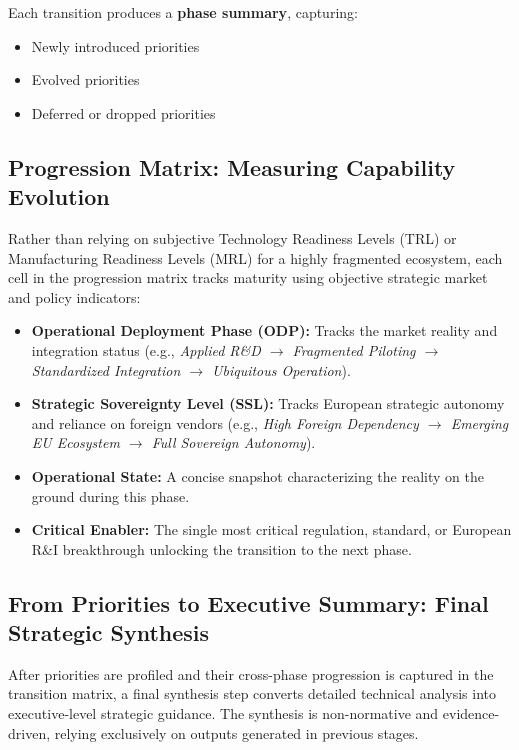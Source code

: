 \documentclass{ieeeaccess}
\begin{document}
Each transition produces a \textbf{phase summary}, capturing:

\begin{itemize}
    \item Newly introduced priorities
    \item Evolved priorities
    \item Deferred or dropped priorities
\end{itemize}

\subsection{Progression Matrix: Measuring Capability Evolution}
Rather than relying on subjective Technology Readiness Levels (TRL) or Manufacturing Readiness Levels (MRL) for a highly fragmented ecosystem, each cell in the progression matrix tracks maturity using objective strategic market and policy indicators:

\begin{itemize}
    \item \textbf{Operational Deployment Phase (ODP):} Tracks the market reality and integration status (e.g., \textit{Applied R\&D $\rightarrow$ Fragmented Piloting $\rightarrow$ Standardized Integration $\rightarrow$ Ubiquitous Operation}).
    \item \textbf{Strategic Sovereignty Level (SSL):} Tracks European strategic autonomy and reliance on foreign vendors (e.g., \textit{High Foreign Dependency $\rightarrow$ Emerging EU Ecosystem $\rightarrow$ Full Sovereign Autonomy}).
    \item \textbf{Operational State:} A concise snapshot characterizing the reality on the ground during this phase.
    \item \textbf{Critical Enabler:} The single most critical regulation, standard, or European R\&I breakthrough unlocking the transition to the next phase.
\end{itemize}

\subsection{From Priorities to Executive Summary: Final Strategic Synthesis}

After priorities are profiled and their cross-phase progression is captured in the transition matrix, a final synthesis step converts detailed technical analysis into executive-level strategic guidance. The synthesis is non-normative and evidence-driven, relying exclusively on outputs generated in previous stages.
\end{document}

